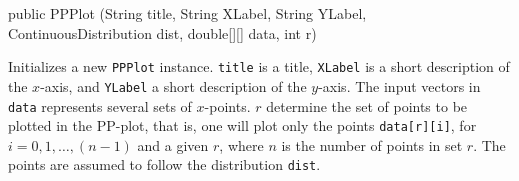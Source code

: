 \begin{code}

   public PPPlot (String title, String XLabel, String YLabel,
                  ContinuousDistribution dist, double[][] data, int r) \begin{hide} {
      this (title, XLabel, YLabel, dist, data[r], data[r].length);
   }
}\end{hide}
\end{code}
\begin{tabb}
   Initializes a new \texttt{PPPlot} instance.
   \texttt{title} is a title, \texttt{XLabel} is a short description of
   the $x$-axis, and \texttt{YLabel}  a short description of the $y$-axis.
   The input vectors in \texttt{data} represents several sets of $x$-points.
   $r$ determine the set of points to be plotted in the PP-plot, that is,
   one will plot only the points \texttt{data[r][i]},
   for $i=0, 1, \ldots, (n-1)$ and a given $r$, where $n$ is the number
   of points in set $r$. The points are assumed to follow the distribution
  \texttt{dist}.
\end{tabb}
\begin{htmlonly}
\end{htmlonly}
